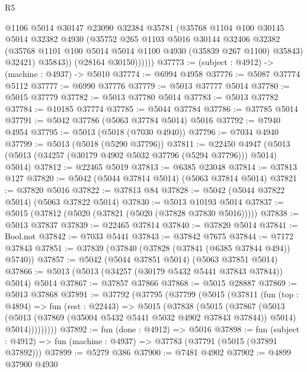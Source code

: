 \begin{lexlean}{R5}
\begin{coremodule}
                @1106
                @5014
                @30147
                @23090
                @32384
                @35781
                (@35768
                  @1104
                  @100
                  @30145
                  @5014
                  @32382
                  @4930
                  (@35752
                    @265
                    @1103
                    @5016
                    @30144
                    @32406
                    @32382
                    (@35768 @1101 @100 @5014 @5014 @1100 @4930 (@35839 @267 @1100) @35843)
                    @32421)
                  @35843))
              (@28164 @30150))))))
@37773 := (subject : @4912) -> (machine : @4937) -> @5010
@37774 := @6994 @4958
@37776 := @5087 @37774 @5112
@37777 := @6990 @37776
@37779 := @5013 @37777 @5014
@37780 := @5015 @37779
@37782 := @5013 @37780 @5014
@37783 := @5013 @37782
@37784 := @10185 @37774
@37785 := @5044 @37784
@37786 := @37785 @5014
@37791 := @5042 @37786 (@5063 @37784 @5014) @5016
@37792 := @7940 @4954
@37795 := @5013 (@5018 (@7030 @4940))
@37796 := @7034 @4940
@37799 := @5013 (@5018 (@5290 @37796))
@37811 := @22450
    @4947
    (@5013 (@5013 (@34257 (@30179 @4902 @5032 @37796 (@5294 @37796))) @5014) @5014)
@37812 := @22465 @5019
@37813 := @6385 @23048
@37814 := @37813 @127
@37820 := @5042 (@5044 @37814 @5014) (@5063 @37814 @5014)
@37821 := @37820 @5016
@37822 := @37813 @84
@37828 := @5042 (@5044 @37822 @5014) (@5063 @37822 @5014)
@37830 := @5013 @10193 @5014
@37837 := @5015 (@37812 (@5020 (@37821 (@5020 (@37828 @37830 @5016)))))
@37838 := @5013 @37837
@37839 := @22465 @37814
@37840 := @37820 @5014
@37841 := Bool.not
@37842 := @7033 @5441
@37843 := @37842 @7675
@37844 := @7172 @37843
@37851 := @37839 (@37840 (@37828 (@37841 (@6385 @37844 @494)) @5740))
@37857 := @5042 (@5044 @37851 @5014) (@5063 @37851 @5014)
@37866 := @5013 (@5013 (@34257 (@30179 @5432 @5441 @37843 @37844)) @5014) @5014
@37867 := @37857 @37866
@37868 := @5015 @28887
@37869 := @5013 @37868
@37891 := @37792
    (@37795
      (@37799
        (@5015
          (@37811
            (fun (top : @4894) =>
            fun (rest : @22443) =>
            @5015
              (@37838
                (@5015
                  (@37867
                    (@5013
                      (@5013 (@37869 (@35004 @5432 @5441 @5032 @4902 @37843 @37844)) @5014)
                      @5014)))))))))
@37892 := fun (done : @4912) => @5016
@37898 := fun (subject : @4912) => fun (machine : @4937) => @37783 (@37791 (@5015 (@37891 @37892)))
@37899 := @5279 @386
@37900 := @7481 @4902
@37902 := @4899 @37900 @4930

\end{coremodule}
\end{lexlean}

